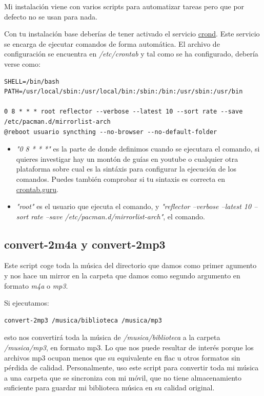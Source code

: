 \documentclass[12pt]{article}
\begin{document}
Mi instalación viene con varios scripts para automatizar tareas pero que por defecto no se usan para nada.

Con tu instalación base deberías de tener activado el servicio \href{https://wiki.archlinux.org/title/cron}{crond}. Este servicio se encarga de ejecutar comandos de forma automática. El archivo de configuración se encuentra en \emph{/etc/crontab} y tal como se ha configurado, debería verse como:


\begin{lstlisting}[basicstyle=\scriptsize\ttfamily]
SHELL=/bin/bash
PATH=/usr/local/sbin:/usr/local/bin:/sbin:/bin:/usr/sbin:/usr/bin

0 8 * * * root reflector --verbose --latest 10 --sort rate --save /etc/pacman.d/mirrorlist-arch
@reboot usuario syncthing --no-browser --no-default-folder
\end{lstlisting}

\begin{itemize}
\setlength\itemsep{-0.2em}
\item \emph{"0 8 * * *"} es la parte de donde definimos cuando se ejecutara el comando, si quieres investigar hay un montón de guías en youtube o cualquier otra plataforma sobre cual es la sintáxis para configurar la ejecución de los comandos. Puedes también comprobar si tu sintaxis es correcta en \href{https://crontab.guru/}{crontab.guru}.
\item \emph{"root"} es el usuario que ejecuta el comando, y \emph{"reflector --verbose --latest 10 --sort rate --save /etc/pacman.d/mirrorlist-arch"}, el comando.
\end{itemize}

\subsection{convert-2m4a y convert-2mp3}

Este script coge toda la música del directorio que damos como primer agumento y nos hace un mirror en la carpeta que damos como segundo argumento en formato \emph{m4a} o \emph{mp3}.

Si ejecutamos:
\begin{verbatim}
convert-2mp3 /musica/biblioteca /musica/mp3
\end{verbatim}

esto nos convertirá toda la música de \emph{/musica/biblioteca} a la carpeta \emph{/musica/mp3}, en formato mp3. Lo que nos puede resultar de interés porque los archivos mp3 ocupan menos que su equivalente en flac u otros formatos sin pérdida de calidad. Personalmente, uso este script para convertir toda mi música a una carpeta que se sincroniza con mi móvil, que no tiene almacenamiento suficiente para guardar mi biblioteca música en su calidad original.
\end{document}
